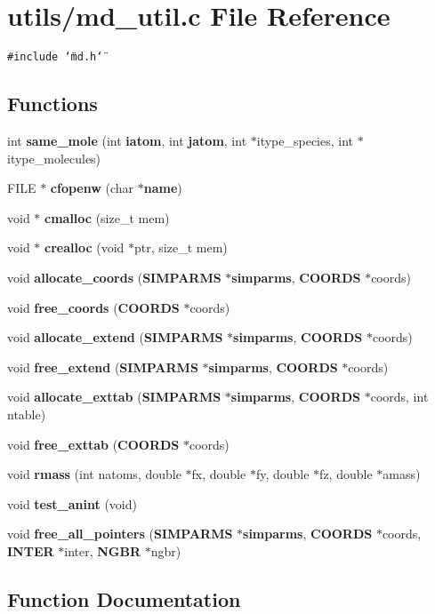 \section{utils/md\_\-util.c File Reference}
\label{md__util_8c}
{\tt \#include \char`\"{}md.h\char`\"{}}\par
\subsection*{Functions}
\begin{CompactItemize}
\item 
int {\bf same\_\-mole} (int {\bf iatom}, int {\bf jatom}, int $\ast$itype\_\-species, int $\ast$itype\_\-molecules)
\item 
FILE $\ast$ {\bf cfopenw} (char $\ast${\bf name})
\item 
void $\ast$ {\bf cmalloc} (size\_\-t mem)
\item 
void $\ast$ {\bf crealloc} (void $\ast$ptr, size\_\-t mem)
\item 
void {\bf allocate\_\-coords} ({\bf SIMPARMS} $\ast${\bf simparms}, {\bf COORDS} $\ast$coords)
\item 
void {\bf free\_\-coords} ({\bf COORDS} $\ast$coords)
\item 
void {\bf allocate\_\-extend} ({\bf SIMPARMS} $\ast${\bf simparms}, {\bf COORDS} $\ast$coords)
\item 
void {\bf free\_\-extend} ({\bf SIMPARMS} $\ast${\bf simparms}, {\bf COORDS} $\ast$coords)
\item 
void {\bf allocate\_\-exttab} ({\bf SIMPARMS} $\ast${\bf simparms}, {\bf COORDS} $\ast$coords, int ntable)
\item 
void {\bf free\_\-exttab} ({\bf COORDS} $\ast$coords)
\item 
void {\bf rmass} (int natoms, double $\ast$fx, double $\ast$fy, double $\ast$fz, double $\ast$amass)
\item 
void {\bf test\_\-anint} (void)
\item 
void {\bf free\_\-all\_\-pointers} ({\bf SIMPARMS} $\ast${\bf simparms}, {\bf COORDS} $\ast$coords, {\bf INTER} $\ast$inter, {\bf NGBR} $\ast$ngbr)
\end{CompactItemize}


\subsection{Function Documentation}
